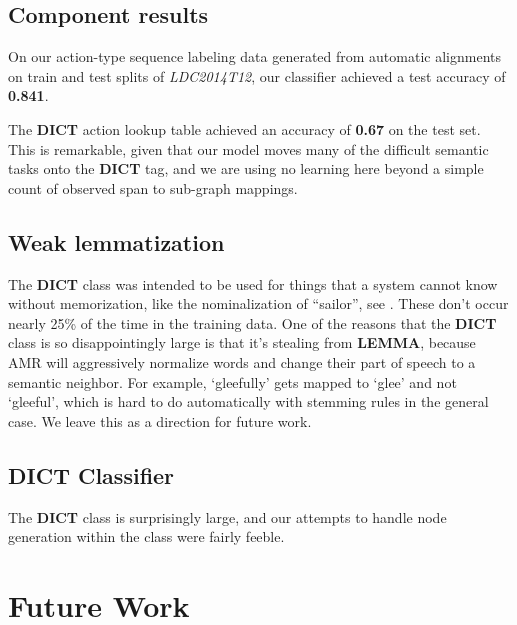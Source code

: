 \documentclass[11pt]{article}
\begin{document}

\subsection{Component results}

On our action-type sequence labeling data generated from automatic alignments on train and test splits of \textit{LDC2014T12}, our classifier achieved a test accuracy of \textbf{0.841}.

The \textbf{DICT} action lookup table achieved an accuracy of \textbf{0.67} on the test set. This is remarkable, given that our model moves many of the difficult semantic tasks onto the \textbf{DICT} tag, and we are using no learning here beyond a simple count of observed span to sub-graph mappings.



\subsection{Weak lemmatization}

The \textbf{DICT} class was intended to be used for things that a system cannot know without memorization, like the nominalization of ``sailor'', see . These don't occur nearly 25\% of the time in the training data. One of the reasons that the \textbf{DICT} class is so disappointingly large is that it's stealing from \textbf{LEMMA}, because AMR will aggressively normalize words and change their part of speech to a semantic neighbor. For example, `gleefully' gets mapped to `glee' and not `gleeful', which is hard to do automatically with stemming rules in the general case. We leave this as a direction for future work.

\subsection{DICT Classifier}

The \textbf{DICT} class is surprisingly large, and our attempts to handle node generation within the class were fairly feeble.

\section{Future Work}
\end{document}
